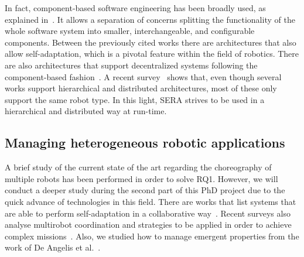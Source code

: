 In fact, component-based software engineering has been broadly used, as explained in~\cite{Brugali2009}. 
It allows a separation of concerns splitting the functionality of the whole software system into smaller, interchangeable, and configurable components. 
Between the previously cited works there are architectures that also allow self-adaptation, which is a pivotal feature within the field of robotics.
There are also architectures that support decentralized systems following the component-based fashion~\cite{Lesire2016}.
A recent survey~\cite{Yan2013} shows that, even though several works support hierarchical and distributed architectures, most of these only support the same robot type. 
In this light, SERA strives to be used in a hierarchical and distributed way at run-time.

\subsection{Managing heterogeneous robotic applications}

A brief study of the current state of the art regarding the choreography of multiple robots has been performed in order to solve RQ1.
However, we will conduct a deeper study during the second part of this PhD project due to the quick advance of technologies in this field.
There are works that list systems that are able to perform self-adaptation in a collaborative way~\cite{DeLemos2013}.
Recent surveys also analyse multirobot coordination and strategies to be applied in order to achieve complex missions~\cite{Yan2013}.
Also, we studied how to manage emergent properties from the work of De Angelis et al.~\cite{DeAngelis2015,DeAngelis2016}.
